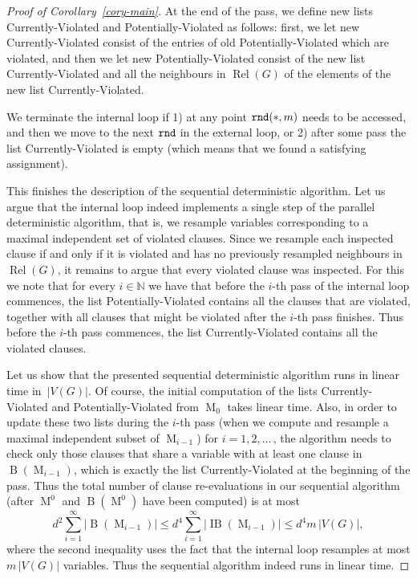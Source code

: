 \documentclass[12pt,a4paper]{article}
\numberwithin{equation}{section}
\theoremstyle{definition}
\renewcommand{\le}{\leqslant}
\newcommand\NN{\mathbb N}
\newcommand\MT{\operatorname{M}}
\newcommand\B{\operatorname{B}}
\newcommand\IB{\operatorname{IB}}
\newcommand\Rel{\operatorname{Rel}}
\begin{document}
\begin{proof}[Proof of Corollary~\ref{cory-main}]
    At the end of the pass, we define new lists Currently-Violated and Potentially-Violated as follows: first, we let new Currently-Violated consist of the entries of old Potentially-Violated which are violated, and then we let new Potentially-Violated consist of the new list Currently-Violated and all the neighbours in $\Rel(G)$ of the elements of the new list Currently-Violated. 
    
    We terminate the internal loop if 1) at any point $\normalfont{\texttt{rnd}}(\ast, m)$ needs to be accessed, and then we move to the next $\normalfont{\texttt{rnd}}$ in the external loop, or 2) after some pass the list Currently-Violated is empty (which means that we found a satisfying assignment).
    
    This finishes the description of the sequential deterministic algorithm. Let us argue that the internal loop indeed implements a single step of the parallel deterministic algorithm, that is, we resample variables corresponding to a maximal independent set of violated clauses. Since we resample each inspected clause if and only if it is violated and has no previously resampled neighbours in $\Rel(G)$, it remains to argue that every violated clause was inspected. 
    For this we note that for every $i\in \NN$ we have that before the $i$-th pass of the internal loop commences, the list Potentially-Violated contains all the clauses that are violated, together with all clauses that might be violated after the $i$-th pass finishes. Thus before the $i$-th pass commences, the list Currently-Violated contains all the violated clauses.
    
    
    Let us show that
    the presented sequential deterministic algorithm runs in linear time  in~$|V(G)|$. Of course, the initial computation of the lists Currently-Violated and Poten\-tially-Violated from $\MT_0$ takes linear time. Also, in order to update these two lists during the $i$-th pass (when we compute and resample a maximal independent subset of $\MT_{i-1}$) for $i=1,2,\ldots$\,, the algorithm needs to check only those clauses that share a variable with at least one clause in  $\B(\MT_{i-1})$, which is exactly the list Currently-Violated at the beginning of the pass.
    Thus the total number of clause re-evaluations in our sequential algorithm (after $\MT^0$ and $\B(\MT^0)$ have been computed) is at most 
    $$
     d^2\sum_{i=1}^\infty |\B(\MT_{i-1})|\le d^4\sum_{i=1}^\infty |\IB(\MT_{i-1})|\le d^4m\,|V(G)|,
     $$ 
     where the second inequality uses the fact that the internal loop resamples at most $m\,|V(G)|$ variables. Thus the sequential algorithm indeed runs in linear time.\end{proof}
    
\end{document}
